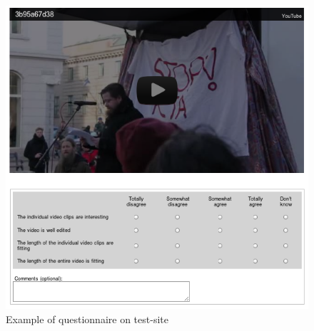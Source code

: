 %
\begin{figure}
     \centering
     \includegraphics[width=1.0\textwidth]{img/quest_dump.png}
     \caption{Example of questionnaire on test-site}\label{fig:questdump}
\end{figure}
%
